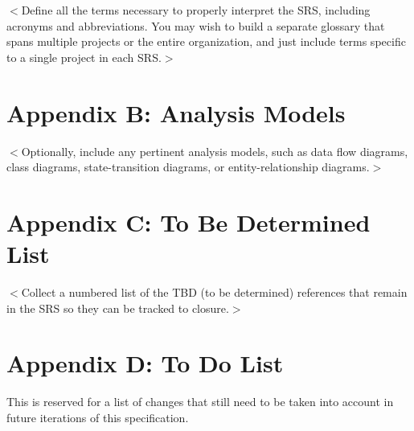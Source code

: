 \documentclass{scrreprt}
\begin{document}
    $<$Define all the terms necessary to properly interpret the SRS, including
    acronyms and abbreviations.
    You may wish to build a separate glossary that spans multiple projects
    or the entire organization, and just include terms specific to
    a single project in each SRS.$>$

  \section{Appendix B: Analysis Models}

    $<$Optionally, include any pertinent analysis models, such as data flow
    diagrams, class diagrams, state-transition diagrams, or entity-relationship
    diagrams.$>$

  \section{Appendix C: To Be Determined List}

    $<$Collect a numbered list of the TBD (to be determined) references that
    remain in the SRS so they can be tracked to closure.$>$

  \section{Appendix D: To Do List}

    This is reserved for a list of changes that still need to be taken into
    account in future iterations of this specification.
\end{document}
